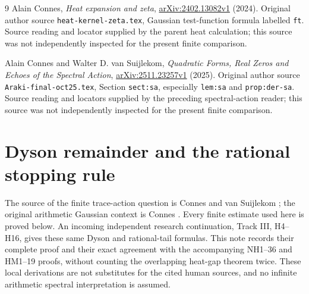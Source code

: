 \documentclass[11pt]{article}
\begin{document}
\begin{thebibliography}{9}
Alain Connes, \emph{Heat expansion and zeta},
\href{https://arxiv.org/abs/2402.13082v1}{arXiv:2402.13082v1} (2024).
Original author source \texttt{heat-kernel-zeta.tex}, Gaussian test-function
formula labelled \texttt{ft}. Source reading and locator supplied by the parent
heat calculation; this source was not independently inspected for the present
finite comparison.

Alain Connes and Walter D. van Suijlekom,
\emph{Quadratic Forms, Real Zeros and Echoes of the Spectral Action},
\href{https://arxiv.org/abs/2511.23257v1}{arXiv:2511.23257v1} (2025).
Original author source \texttt{Araki-final-oct25.tex},
Section \texttt{sect:sa}, especially \texttt{lem:sa} and
\texttt{prop:der-sa}. Source reading and locators supplied by the preceding
spectral-action reader; this source was not independently inspected for the
present finite comparison.
\end{thebibliography}

\endgroup

\clearpage\begingroup
\part*{Dyson remainder and the rational stopping rule}
\newcommand{\nhdtr}{\operatorname{tr}}
\newcommand{\nhdRea}{\operatorname{Re}}


The source of the finite trace-action question is Connes and van
Suijlekom \cite[Section on the spectral action]{nhd:CV}; the original
arithmetic Gaussian context is Connes \cite[Gaussian equation ft]{nhd:CH}.
Every finite estimate used here is proved below. An incoming independent
research continuation, Track III, H4--H16, gives these same Dyson and
rational-tail formulas. This note records their complete proof and their
exact agreement with the accompanying NH1--36 and HM1--19 proofs,
without counting the overlapping heat-gap theorem twice.
These local derivations are not substitutes for the cited human sources,
and no infinite arithmetic spectral interpretation is assumed.
\end{document}
